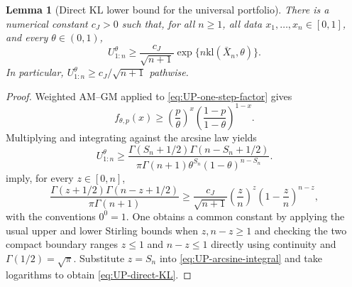 \documentclass[12pt]{article}
\theoremstyle{spaced}
\newtheorem{lemma}[lemma]{Lemma}
\theoremstyle{remark}
\newcommand{\kl}{\mathrm{kl}}
\begin{document}
\begin{lemma}[Direct KL lower bound for the universal portfolio]
\label{lem:UP-direct-KL}
There is a numerical constant $c_J>0$ such that, for all $n\ge1$, all data
$x_1,\ldots,x_n\in[0,1]$, and every $\theta\in(0,1)$,
\begin{equation}
\label{eq:UP-direct-KL}
 U_{1:n}^{\theta}
 \ge \frac{c_J}{\sqrt{n+1}}
       \exp\{n\kl(\bar X_n,\theta)\}.
\end{equation}
In particular, $U_{1:n}^{\theta}\ge c_J/\sqrt{n+1}$ pathwise.
\end{lemma}
\begin{proof}
Weighted AM--GM applied to \eqref{eq:UP-one-step-factor} gives
\[
 f_{\theta,p}(x)
 \ge \left(\frac p\theta\right)^x
      \left(\frac{1-p}{1-\theta}\right)^{1-x}.
\]
Multiplying and integrating against the arcsine law yields
\begin{equation}
\label{eq:UP-arcsine-integral}
 U_{1:n}^{\theta}
 \ge
 \frac{\Gamma(S_n+1/2)\Gamma(n-S_n+1/2)}
      {\pi\Gamma(n+1)\theta^{S_n}(1-\theta)^{n-S_n}}.
\end{equation}
 imply, for every $z\in[0,n]$,
\[
 \frac{\Gamma(z+1/2)\Gamma(n-z+1/2)}{\pi\Gamma(n+1)}
 \ge \frac{c_J}{\sqrt{n+1}}
       \left(\frac zn\right)^z
       \left(1-\frac zn\right)^{n-z},
\]
with the conventions $0^0=1$.  One obtains a common constant by applying
the usual upper and lower Stirling bounds when $z,n-z\ge1$ and checking the
two compact boundary ranges $z\le1$ and $n-z\le1$ directly using continuity
and $\Gamma(1/2)=\sqrt\pi$.  Substitute $z=S_n$ into
\eqref{eq:UP-arcsine-integral} and take logarithms to obtain
\eqref{eq:UP-direct-KL}.
\end{proof}
\end{document}
